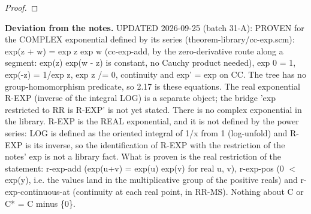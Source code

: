 \begin{proof}
%
%
%
%
%
%
%
%
%
%
%
%
%
%
\end{proof}
%
\noindent\textbf{Deviation from the notes.} UPDATED 2026-09-25 (batch 31-A): PROVEN for the COMPLEX exponential defined by its series (theorem-library/cc-exp.scm): exp(z + w) = exp z exp w (cc-exp-add, by the zero-derivative route along a segment: exp(z) exp(w - z) is constant, no Cauchy product needed), exp 0 = 1, exp(-z) = 1/exp z, exp z /= 0, continuity and exp' = exp on CC. The tree has no group-homomorphism predicate, so 2.17 is these equations. The real exponential R-EXP (inverse of the integral LOG) is a separate object; the bridge 'exp restricted to RR is R-EXP' is not yet stated. There is no complex exponential in the library. R-EXP is the REAL exponential, and it is not defined by the power series: LOG is defined as the oriented integral of 1/x from 1 (log-unfold) and R-EXP is its inverse, so the identification of R-EXP with the restriction of the notes' exp is not a library fact. What is proven is the real restriction of the statement: r-exp-add (exp(u+v) = exp(u) exp(v) for real u, v), r-exp-pos (0 $<$ exp(y), i.e. the values land in the multiplicative group of the positive reals) and r-exp-continuous-at (continuity at each real point, in RR-MS). Nothing about C or C* = C minus \{0\}.
